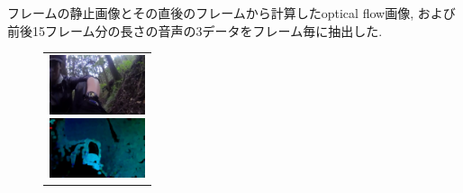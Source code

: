 \documentclass[MIRU,submit,english]{miru2019e}
\begin{document}
フレームの静止画像とその直後のフレームから計算したoptical flow画像, および前後15フレーム分の長さの音声の3データをフレーム毎に抽出した.


\begin{figure}[tb]
    \begin{tabular}{l}

      \begin{minipage}{0.32\hsize}
        \begin{center}
          \includegraphics[clip, width=2.8cm]{./Figures/still_seevictim3.eps}
        \end{center}
      \end{minipage}

      \begin{minipage}{0.32\hsize}
        \begin{center}
          \includegraphics[clip, width=2.8cm]{./Figures/optic_seevictim3.eps}
        \end{center}
      \end{minipage}


\end{tabular}
\end{figure}
\end{document}
